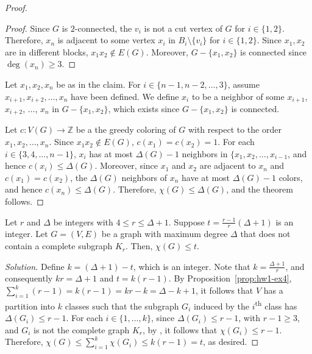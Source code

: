 \begin{proof}
\begin{proof}
        Since \(G\) is \(2\)-connected, the \(v_i\) is not a cut vertex of \(G\) for \(i \in \{1, 2\}\).
        Therefore, \(x_n\) is adjacent to some vertex \(x_i\) in \(B_i \setminus \{v_i\}\) for \(i \in \{1, 2\}\).
        Since \(x_1, x_2\) are in different blocks, \(x_1x_2 \notin E(G)\).
        Moreover, \(G - \{x_1, x_2\}\) is connected since \(\deg(x_n) \geq 3\).
    \end{proof}

    Let \(x_1, x_2, x_n\) be as in the claim.
    For \(i \in \{n-1, n-2, \ldots, 3\}\),
    assume \(x_{i+1}, x_{i+2}, \ldots, x_n\) have been defined.
    We define \(x_i\) to be a neighbor of some \(x_{i+1}\), \(x_{i+2}\), \(\ldots\), \(x_n\) in \(G - \{x_1, x_2\}\), which exists since \(G - \{x_1, x_2\}\) is connected.

    Let \(c \colon V(G) \to \mathbb{Z}\) be a the greedy coloring of \(G\) with respect to the order \(x_1, x_2, \ldots, x_n\).
    Since \(x_1x_2 \notin E(G)\), \(c(x_1) = c(x_2) = 1\).
    For each \(i \in \{3, 4, \ldots, n-1\}\),
    \(x_i\) has at most \(\Delta(G) - 1\) neighbors in \(\{x_1, x_2, \ldots, x_{i-1}\), and hence \(c(x_i) \leq \Delta(G)\).
    Moreover, since \(x_1\) and \(x_2\) are adjacent to \(x_n\) and \(c(x_1) = c(x_2)\), the \(\Delta(G)\) neighbors of \(x_n\) have at most \(\Delta(G) - 1\) colors, and hence \(c(x_n) \leq \Delta(G)\).
    Therefore, \(\chi(G) \leq \Delta(G)\), and the theorem follows.
\end{proof}

\begin{proposition} \label{prop:hw1-ex5}
Let \(r\) and \(\Delta\) be integers with \(4 \leq r \leq \Delta + 1\).
Suppose \(t = \frac{r-1}{r}(\Delta + 1)\) is an integer.
Let \(G = (V, E)\) be a graph with maximum degree \(\Delta\)
that does not contain a complete subgraph \(K_r\).
Then, \(\chi(G) \leq t\).
\end{proposition}

\begin{proof}[Solution]
    Define \( k = (\Delta + 1) - t\), which is an integer.
    Note that \(k = \frac{\Delta + 1}{r}\), and consequently
    \( kr = \Delta + 1 \) and \(t = k(r-1)\).
    By Proposition~\ref{prop:hw1-ex4},
    \( \sum_{i=1}^k (r-1) = k(r-1) = kr - k = \Delta - k + 1 \),
    it follows that \(V\) has a partition into \(k\) classes such that the subgraph \(G_i\) induced by the \(i\)\textsuperscript{th} class has \(\Delta\left(G_i\right) \leq r - 1\).
    For each \(i \in \{1, \ldots, k\}\),
    since
    \(\Delta(G_i) \leq r-1\), with \(r - 1 \geq 3\), and
    \(G_i\) is not the complete graph \(K_r\),
    by ,
    it follows that \(\chi(G_i) \leq r-1\).
    Therefore, \(\chi(G) \leq \sum_{i=1}^k \chi(G_i) \leq k(r-1) = t\), as desired.
\end{proof}

